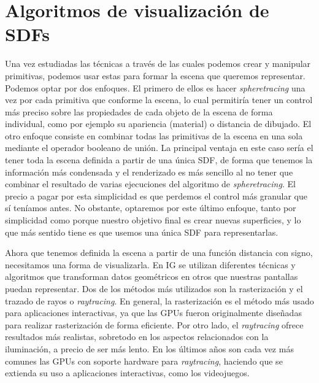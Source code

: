 \chapter{Algoritmos de visualización de SDFs}\label{cap:2}
Una vez estudiadas las técnicas a través de las cuales podemos crear y manipular primitivas, podemos usar estas para formar la escena que queremos representar. Podemos optar por dos enfoques. El primero de ellos es hacer \textit{spheretracing} una vez por cada primitiva que conforme la escena, lo cual permitiría tener un control más preciso sobre las propiedades de cada objeto de la escena de forma individual, como por ejemplo su apariencia (material) o distancia de dibujado. El otro enfoque consiste en combinar todas las primitivas de la escena en una sola mediante el operador booleano de unión. La principal ventaja en este caso sería el tener toda la escena definida a partir de una única SDF, de forma que tenemos la información más condensada y el renderizado es más sencillo al no tener que combinar el resultado de varias ejecuciones del algoritmo de \textit{spheretracing}. El precio a pagar por esta simplicidad es que perdemos el control más granular que sí teníamos antes. No obstante, optaremos por este último enfoque, tanto por simplicidad como porque nuestro objetivo final es crear nuevas superficies, y lo que más sentido tiene es que usemos una única SDF para representarlas.\newline

Ahora que tenemos definida la escena a partir de una función distancia con signo, necesitamos una forma de visualizarla. En IG se utilizan diferentes técnicas y algoritmos que transforman datos geométricos en otros que nuestras pantallas puedan representar. Dos de los métodos más utilizados son la rasterización y el trazado de rayos o \textit{raytracing}. En general, la rasterización es el método más usado para aplicaciones interactivas, ya que las GPUs fueron originalmente diseñadas para realizar rasterización de forma eficiente. Por otro lado, el \textit{raytracing} ofrece resultados más realistas, sobretodo en los aspectos relacionados con la iluminación, a precio de ser más lento. En los últimos años son cada vez más comunes las GPUs con soporte hardware para \textit{raytracing}, haciendo que se extienda su uso a aplicaciones interactivas, como los videojuegos.\newline

